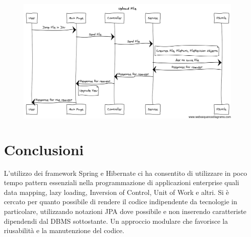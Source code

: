 \begin{figure}
  \includegraphics[scale=0.4]{upload}
  \caption{}
  \label{upload}
\end{figure}

\chapter{Conclusioni}

L'utilizzo dei framework Spring e Hibernate ci ha consentito di
utilizzare in poco tempo pattern essenziali nella programmazione di
applicazioni enterprise quali data mapping, lazy loading, Inversion of
Control, Unit of Work e altri. Si è cercato per quanto possibile di
rendere il codice indipendente da tecnologie in particolare,
utilizzando notazioni JPA dove possibile e non inserendo caratteriste
dipendendi dal DBMS sottostante. Un approccio modulare che favorisce
la riusabilità e la manutenzione del codice.

